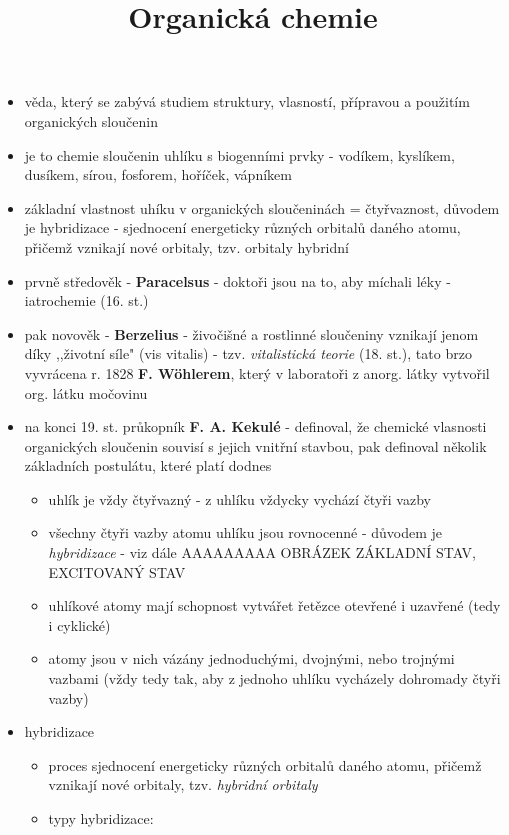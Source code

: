 \documentclass{article}
\title{\vspace{-2cm}Organická chemie\vspace{-1.7cm}}
\date{}
\author{}
\begin{document}
\maketitle

\begin{itemize}
  \item věda, který se zabývá studiem struktury, vlasností, přípravou a použitím organických sloučenin
  \item je to chemie sloučenin uhlíku s biogenními prvky - vodíkem, kyslíkem, dusíkem, sírou, fosforem, hoříček, vápníkem
  \item základní vlastnost uhíku v organických sloučeninách = čtyřvaznost, důvodem je hybridizace - sjednocení energeticky různých orbitalů daného atomu, přičemž vznikají nové orbitaly, tzv. orbitaly hybridní
  \item prvně středověk - \textbf{Paracelsus} - doktoři jsou na to, aby míchali léky - iatrochemie (16. st.)
  \item pak novověk - \textbf{Berzelius} - živočišné a rostlinné sloučeniny vznikají jenom díky ,,životní síle" (vis vitalis) - tzv. \textit{vitalistická teorie} (18. st.), tato brzo vyvrácena r. 1828 \textbf{F. Wöhlerem}, který v laboratoři z anorg. látky vytvořil org. látku močovinu
  \item na konci 19. st. průkopník \textbf{F. A. Kekulé} - definoval, že chemické vlasnosti organických sloučenin souvisí s jejich vnitřní stavbou, pak definoval několik základních postulátu, které platí dodnes
  \begin{itemize}
    \item uhlík je vždy čtyřvazný - z uhlíku vždycky vychází čtyři vazby
    \item všechny čtyři vazby atomu uhlíku jsou rovnocenné - důvodem je \textit{hybridizace} - viz dále
    AAAAAAAAA OBRÁZEK ZÁKLADNÍ STAV, EXCITOVANÝ STAV
    \item uhlíkové atomy mají schopnost vytvářet řetězce otevřené i uzavřené (tedy i cyklické)
    \item atomy jsou v nich vázány jednoduchými, dvojnými, nebo trojnými vazbami (vždy tedy tak, aby z jednoho uhlíku vycházely dohromady čtyři vazby)
  \end{itemize}
  \item hybridizace
  \begin{itemize}
    \item proces sjednocení energeticky různých orbitalů daného atomu, přičemž vznikají nové orbitaly, tzv. \textit{hybridní orbitaly}
    \item typy hybridizace:

\end{itemize}
\end{itemize}
\end{document}
